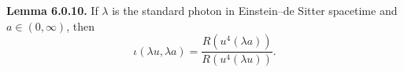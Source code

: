 \textbf{Lemma 6.0.10.} If $\lambda$ is the standard photon in Einstein--de Sitter spacetime and $a \in (0, \infty)$, then
$$\iota(\lambda u, \lambda a) = \frac{R(u^4(\lambda a))}{R(u^4(\lambda u))}.$$
